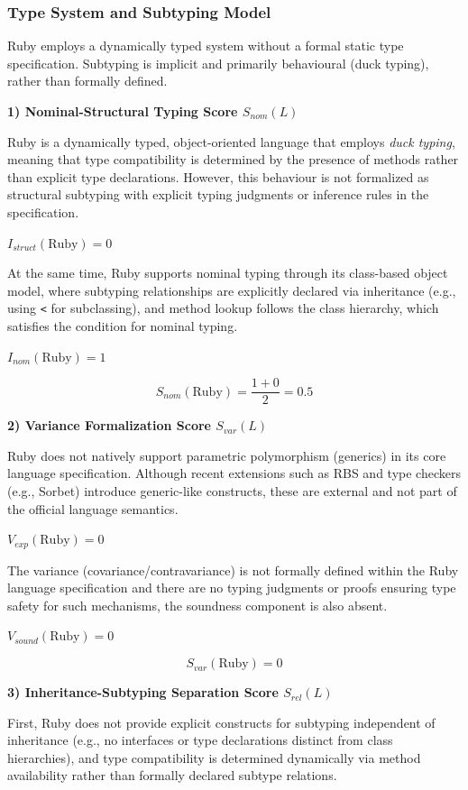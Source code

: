 \subsubsection{Type System and Subtyping Model}

Ruby employs a dynamically typed system without a formal static type specification. Subtyping is implicit and primarily behavioural (duck typing), rather than formally defined.

\textbf{1) Nominal-Structural Typing Score $S_{nom}(L)$}

Ruby is a dynamically typed, object-oriented language that employs \emph{duck typing}, meaning that type compatibility is determined by the presence of methods rather than explicit type declarations. However, this behaviour is not formalized as structural subtyping with explicit typing judgments or inference rules in the specification.

$I_{struct}(\text{Ruby})=0$

At the same time, Ruby supports nominal typing through its class-based object model, where subtyping relationships are explicitly declared via inheritance (e.g., using \texttt{<} for subclassing), and method lookup follows the class hierarchy, which satisfies the condition for nominal typing.

$I_{nom}(\text{Ruby})=1$

\[
    S_{nom}(\text{Ruby}) = \frac{1 + 0}{2} = 0.5
\]

\textbf{2) Variance Formalization Score $S_{var}(L)$}

Ruby does not natively support parametric polymorphism (generics) in its core language specification. Although recent extensions such as RBS and type checkers (e.g., Sorbet) introduce generic-like constructs, these are external and not part of the official language semantics.

$V_{exp}(\text{Ruby})=0$

The variance (covariance/contravariance) is not formally defined within the Ruby language specification and there are no typing judgments or proofs ensuring type safety for such mechanisms, the soundness component is also absent.

$V_{sound}(\text{Ruby})=0$

\[
    S_{var}(\text{Ruby}) = 0
\]

\textbf{3) Inheritance-Subtyping Separation Score $S_{rel}(L)$}

First, Ruby does not provide explicit constructs for subtyping independent of inheritance (e.g., no interfaces or type declarations distinct from class hierarchies), and type compatibility is determined dynamically via method availability rather than formally declared subtype relations.

